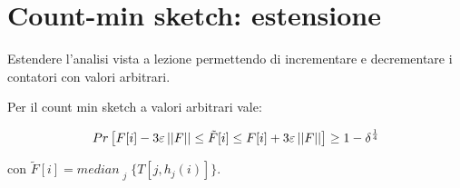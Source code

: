 \chapter{Count-min sketch: estensione}

\begin{problem*}
    Estendere l'analisi vista a lezione permettendo di incrementare e decrementare
    i contatori con valori arbitrari.
\end{problem*}

\begin{lemma}[Approssimazione]
Per il count min sketch a valori arbitrari vale:

\[
    Pr\left[F[i] - 3\varepsilon\left|\left|F\right|\right| \le \tilde{F}[i]
        \le F[i] + 3\varepsilon\left|\left|F\right|\right|\right] \ge 1 - \delta^{\frac{1}{4}}
\]

con $\tilde{F}[i] = median_{\substack{j}}\{T[j, h_j(i)]\}$.
\end{lemma}

